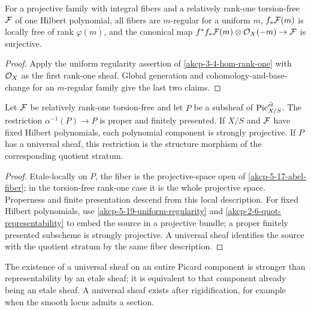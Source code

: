 \begin{lemma}
\label{akcp-5-19-uniform-regularity}
For a projective family with integral fibers and a relatively rank-one
torsion-free $\mathcal F$ of one Hilbert polynomial, all fibers are $m$-regular for a
uniform $m$, $f_*\mathcal F(m)$ is locally free of rank $\varphi(m)$, and the canonical
map $f^*f_*\mathcal F(m)\otimes\mathcal O_X(-m)\to\mathcal F$ is surjective.
\end{lemma}
\begin{proof}
Apply the uniform regularity assertion of
\cref{akcp-3-4-hom-rank-one} with $\mathcal O_X$ as the first rank-one sheaf.  Global
generation and cohomology-and-base-change for an $m$-regular family give the
last two claims.
\end{proof}

\begin{theorem}
\label{akcp-5-20-abel-proper}
Let $\mathcal F$ be relatively rank-one torsion-free and let $P$ be a subsheaf of
$\operatorname{Pic}^{\acute{\mathrm et}}_{X/S}$.  The restriction $\alpha^{-1}(P)\to P$ is
proper and finitely presented.  If $X/S$ and $\mathcal F$ have fixed Hilbert
polynomials, each polynomial component is strongly projective.  If $P$ has a
universal sheaf, this restriction is the structure morphism of the
corresponding quotient stratum.
\end{theorem}
\begin{proof}
Etale-locally on $P$, the fiber is the projective-space open of
\cref{akcp-5-17-abel-fiber}; in the torsion-free rank-one case it is the whole
projective space.  Properness and finite presentation descend from this local
description.  For fixed Hilbert polynomials, use
\cref{akcp-5-19-uniform-regularity} and \cref{akcp-2-6-quot-representability}
to embed the source in a projective bundle; a proper finitely presented
subscheme is strongly projective.  A universal sheaf identifies the source with
the quotient stratum by the same fiber description.
\end{proof}

\begin{remark}
\label{akcp-5-21-universal-sheaf}
The existence of a universal sheaf on an entire Picard component is stronger
than representability by an etale sheaf; it is equivalent to that component
already being an etale sheaf.  A universal sheaf exists after rigidification,
for example when the smooth locus admits a section.
\end{remark}
